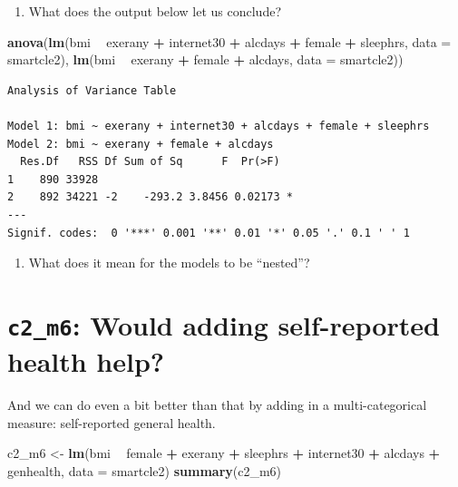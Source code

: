 \documentclass[]{book}
\newenvironment{Shaded}{\begin{snugshade}}{\end{snugshade}}
\newcommand{\KeywordTok}[1]{\textcolor[rgb]{0.13,0.29,0.53}{\textbf{#1}}}
\newcommand{\DataTypeTok}[1]{\textcolor[rgb]{0.13,0.29,0.53}{#1}}
\newcommand{\StringTok}[1]{\textcolor[rgb]{0.31,0.60,0.02}{#1}}
\newcommand{\OperatorTok}[1]{\textcolor[rgb]{0.81,0.36,0.00}{\textbf{#1}}}
\newcommand{\NormalTok}[1]{#1}
\providecommand{\tightlist}{%
  \setlength{\itemsep}{0pt}\setlength{\parskip}{0pt}}
\theoremstyle{definition}
\theoremstyle{definition}
\theoremstyle{definition}
\theoremstyle{remark}
\begin{document}
\begin{enumerate}
\def\labelenumi{\arabic{enumi}.}
\setcounter{enumi}{2}
\tightlist
\item
  What does the output below let us conclude?
\end{enumerate}

\begin{Shaded}
\begin{Highlighting}[]
\KeywordTok{anova}\NormalTok{(}\KeywordTok{lm}\NormalTok{(bmi }\OperatorTok{~}\StringTok{ }\NormalTok{exerany }\OperatorTok{+}\StringTok{ }\NormalTok{internet30 }\OperatorTok{+}\StringTok{ }\NormalTok{alcdays }\OperatorTok{+}\StringTok{ }\NormalTok{female }\OperatorTok{+}\StringTok{ }\NormalTok{sleephrs, }
         \DataTypeTok{data =}\NormalTok{ smartcle2),}
      \KeywordTok{lm}\NormalTok{(bmi }\OperatorTok{~}\StringTok{ }\NormalTok{exerany }\OperatorTok{+}\StringTok{ }\NormalTok{female }\OperatorTok{+}\StringTok{ }\NormalTok{alcdays, }
         \DataTypeTok{data =}\NormalTok{ smartcle2))}
\end{Highlighting}
\end{Shaded}

\begin{verbatim}
Analysis of Variance Table

Model 1: bmi ~ exerany + internet30 + alcdays + female + sleephrs
Model 2: bmi ~ exerany + female + alcdays
  Res.Df   RSS Df Sum of Sq      F  Pr(>F)  
1    890 33928                              
2    892 34221 -2    -293.2 3.8456 0.02173 *
---
Signif. codes:  0 '***' 0.001 '**' 0.01 '*' 0.05 '.' 0.1 ' ' 1
\end{verbatim}

\begin{enumerate}
\def\labelenumi{\arabic{enumi}.}
\setcounter{enumi}{3}
\tightlist
\item
  What does it mean for the models to be ``nested''?
\end{enumerate}

\section{\texorpdfstring{\texttt{c2\_m6}: Would adding self-reported
health
help?}{c2\_m6: Would adding self-reported health help?}}\label{c2_m6-would-adding-self-reported-health-help}

And we can do even a bit better than that by adding in a
multi-categorical measure: self-reported general health.

\begin{Shaded}
\begin{Highlighting}[]
\NormalTok{c2_m6 <-}\StringTok{ }\KeywordTok{lm}\NormalTok{(bmi }\OperatorTok{~}\StringTok{ }\NormalTok{female }\OperatorTok{+}\StringTok{ }\NormalTok{exerany }\OperatorTok{+}\StringTok{ }\NormalTok{sleephrs }\OperatorTok{+}\StringTok{ }\NormalTok{internet30 }\OperatorTok{+}\StringTok{ }\NormalTok{alcdays }\OperatorTok{+}\StringTok{ }\NormalTok{genhealth,}
         \DataTypeTok{data =}\NormalTok{ smartcle2)}
\KeywordTok{summary}\NormalTok{(c2_m6)}
\end{Highlighting}
\end{Shaded}
\end{document}
